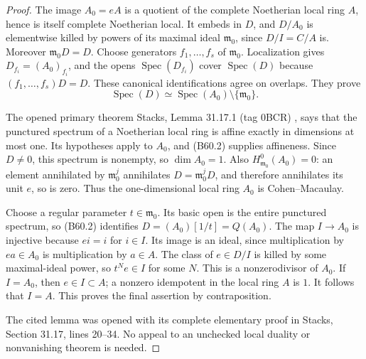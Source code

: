 \begin{proof}
The image $A_0=eA$ is a quotient of the complete
Noetherian local ring $A$, hence is itself complete
Noetherian local. It embeds in $D$, and $D/A_0$
is elementwise killed by powers of its maximal
ideal $\mathfrak m_0$, since $D/I=C/A$ is.
Moreover $\mathfrak m_0D=D$.
Choose generators $f_1,\ldots,f_s$ of
$\mathfrak m_0$. Localization gives
$D_{f_i}=(A_0)_{f_i}$, and the opens
$\operatorname{Spec}(D_{f_i})$ cover
$\operatorname{Spec}(D)$ because $(f_1,\ldots,f_s)D=D$.
These canonical identifications agree on overlaps.
They prove
\[
 \operatorname{Spec}(D)
       \simeq\operatorname{Spec}(A_0)\setminus\{\mathfrak m_0\}.
                                                               \tag{B60.2}
\]

The opened primary theorem Stacks, Lemma 31.17.1
(tag 0BCR) \cite{StacksAffinePuncture}, says that the punctured spectrum of
a Noetherian local ring is affine exactly in
dimensions at most one. Its hypotheses apply
to $A_0$, and (B60.2) supplies affineness.
Since $D\ne0$, this spectrum is nonempty, so
$\dim A_0=1$.
Also $H^0_{\mathfrak m_0}(A_0)=0$: an element
annihilated by $\mathfrak m_0^j$ annihilates
$D=\mathfrak m_0^jD$, and therefore annihilates
its unit $e$, so is zero. Thus the one-dimensional
local ring $A_0$ is Cohen--Macaulay.

Choose a regular parameter $t\in\mathfrak m_0$.
Its basic open is the entire punctured spectrum,
so (B60.2) identifies $D=(A_0)[1/t]=Q(A_0)$.
The map $I\to A_0$ is injective because $ei=i$
for $i\in I$. Its image is an ideal, since
multiplication by $ea\in A_0$ is multiplication
by $a\in A$. The class of $e\in D/I$ is killed
by some maximal-ideal power, so $t^Ne\in I$
for some $N$. This is a nonzerodivisor of $A_0$.
If $I=A_0$, then $e\in I\subset A$; a nonzero
idempotent in the local ring $A$ is $1$.
It follows that $I=A$. This proves the final
assertion by contraposition.

The cited lemma was opened with its complete
elementary proof in Stacks, Section 31.17,
lines 20--34. No appeal to an unchecked local
duality or nonvanishing theorem is needed.
\end{proof}

